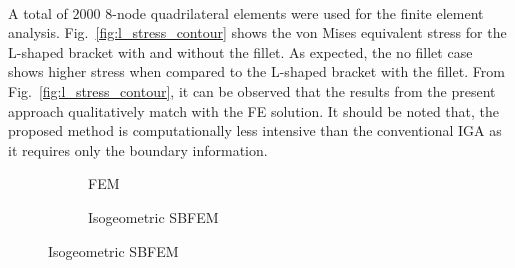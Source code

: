 \paragraph{}
A total of $2000$ $8$-node quadrilateral elements were used for the finite element analysis.
Fig.~\ref{fig:l_stress_contour} shows the von Mises equivalent stress for the L-shaped bracket with and without the fillet.
As expected, the no fillet case shows higher stress when compared to the L-shaped bracket with the fillet.
From Fig.~\ref{fig:l_stress_contour}, it can be observed that the results from the present approach qualitatively match with the FE solution.
It should be noted that, the proposed method is computationally less intensive than the conventional IGA as it requires
    only the boundary information.
    \begin{figure}[h!]
        \begin{subfigure}[b]{0.5\linewidth}
            \centering
            \caption{FEM}
        \end{subfigure}
        \begin{subfigure}[b]{0.5\linewidth}
            \centering
            \caption{Isogeometric SBFEM}
        \end{subfigure}


\end{figure}
